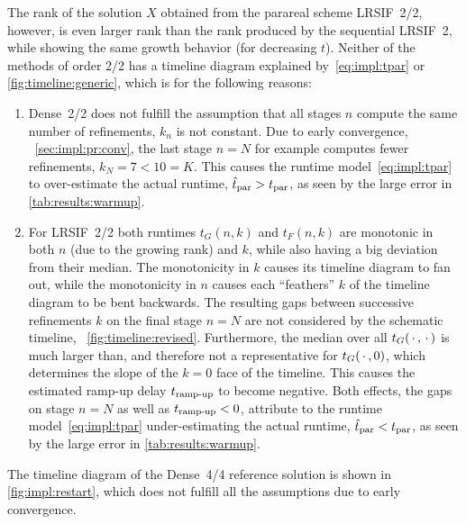 The rank of the solution $X$ obtained from the parareal scheme \ac{LRSIF}~2/2, however,
is even larger rank than the rank produced by the sequential \ac{LRSIF}~2,
while showing the same growth behavior (for decreasing $t$).
Neither of the methods of order 2/2 has a timeline diagram explained by~\eqref{eq:impl:tpar} or \autoref{fig:timeline:generic},
which is for the following reasons:
\begin{enumerate}[resume]
  \item
    Dense~2/2 does not fulfill the assumption that all stages $n$ compute the same number of refinements,
    \ie $k_n$ is not constant.
    Due to early convergence, \cf~\autoref{sec:impl:pr:conv},
    the last stage $n=N$ for example computes fewer refinements, $k_N = 7 < 10 = K$.
    This causes the runtime model~\eqref{eq:impl:tpar} to over-estimate the actual runtime,
    $\hat t_\text{par} > t_\text{par}$,
    as seen by the large error in \autoref{tab:results:warmup}.
  \item
    For \ac{LRSIF}~2/2 both runtimes $t_G(n, k)$ and $t_F(n, k)$ are monotonic in both $n$ (due to the growing rank) and $k$,
    while also having a big deviation from their median.
    The monotonicity in $k$ causes its timeline diagram to fan out,
    while the monotonicity in $n$ causes each \enquote{feathers} $k$ of the timeline diagram to be bent backwards.
    The resulting gaps between successive refinements $k$ on the final stage $n=N$ are not considered
    by the schematic timeline, \cf~\autoref{fig:timeline:revised}.
    Furthermore, the median over all $t_G(\optional{},\optional{})$ is much larger than,
    and therefore not a representative for $t_G(\optional{}, 0)$,
    which determines the slope of the $k=0$ face of the timeline.
    This causes the estimated ramp-up delay $t_\text{ramp-up}$ to become negative.
    Both effects, the gaps on stage $n=N$ as well as $t_\text{ramp-up}<0$,
    attribute to the runtime model~\eqref{eq:impl:tpar} under-estimating the actual runtime,
    $\hat t_\text{par} < t_\text{par}$,
    as seen by the large error in \autoref{tab:results:warmup}.
\end{enumerate}
The timeline diagram of the Dense~4/4 reference solution is shown in \autoref{fig:impl:restart},
which does not fulfill all the assumptions due to early convergence.


